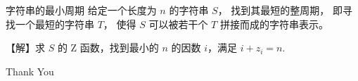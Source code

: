 \documentclass{beamer}
\begin{document}
\begin{frame}[fragile]{字符串的最小周期}
    \small
    给定一个长度为 $n$ 的字符串 $S$，
    找到其最短的整周期，
    即寻找一个最短的字符串 $T$，
    使得 $S$ 可以被若干个 $T$ 拼接而成的字符串表示。

    \pause\vspace{1em}
    【解】求 $S$ 的 Z 函数，找到最小的 $n$ 的因数 $i$，满足 $i+z_i=n$.
\end{frame}

\begin{frame}
    \begin{center}
        {\Huge\calligra Thank You}
    \end{center}
\end{frame}
\end{document}
